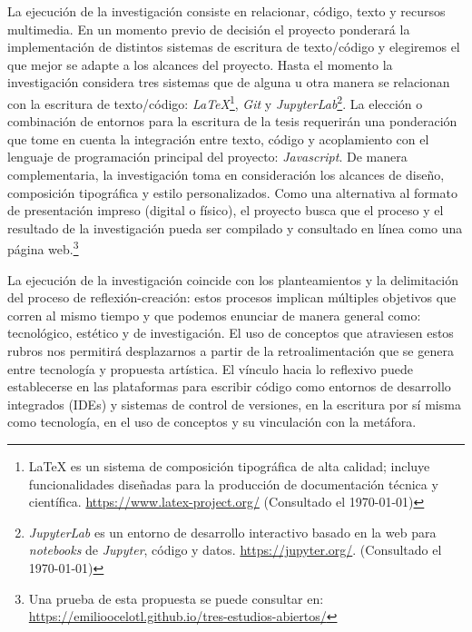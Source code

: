 La ejecución de la investigación consiste en relacionar, código, texto y recursos multimedia. En un momento previo de decisión el proyecto ponderará la implementación de distintos sistemas de escritura de texto/código y elegiremos el que mejor se adapte a los alcances del proyecto. Hasta el momento la investigación considera tres sistemas que de alguna u otra manera se relacionan con la escritura de texto/código: \textit{LaTeX}\footnote{LaTeX es un sistema de composición tipográfica de alta calidad; incluye funcionalidades diseñadas para la producción de documentación técnica y científica. \url{https://www.latex-project.org/} (Consultado el \today)}, \textit{Git} y \textit{JupyterLab}\footnote{\textit{JupyterLab} es un entorno de desarrollo interactivo basado en la web para \textit{notebooks} de \textit{Jupyter}, código y datos. \url{https://jupyter.org/}. (Consultado el \today)}. La elección o combinación de entornos para la escritura de la tesis requerirán una ponderación que tome en cuenta la integración entre texto, código y acoplamiento con el lenguaje de programación principal del proyecto: \textit{Javascript}. De manera complementaria, la investigación toma en consideración los alcances de diseño, composición tipográfica y estilo personalizados. Como una alternativa al formato de presentación impreso (digital o físico), el proyecto busca que el proceso y el resultado de la investigación pueda ser compilado y consultado en línea como una página web.\footnote{Una prueba de esta propuesta se puede consultar en: \url{https://emilioocelotl.github.io/tres-estudios-abiertos/}}

La ejecución de la investigación coincide con los planteamientos y la delimitación del proceso de reflexión-creación: estos procesos implican múltiples objetivos que corren al mismo tiempo y que podemos enunciar de manera general como: tecnológico, estético y de investigación. El uso de conceptos que atraviesen estos rubros nos permitirá desplazarnos a partir de la retroalimentación que se genera entre tecnología y propuesta artística. El vínculo hacia lo reflexivo puede establecerse en las plataformas para escribir código como entornos de desarrollo integrados (IDEs) y sistemas de control de versiones, en la escritura por sí misma como tecnología, en el uso de conceptos y su vinculación con la metáfora. 

